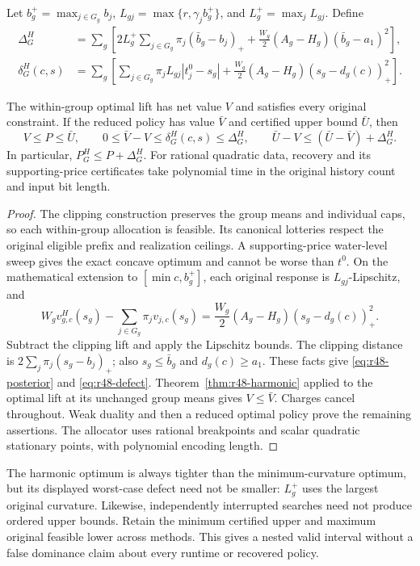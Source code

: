 Let $b_g^+=\max_{j\in G_g}b_j$, $L_{gj}=\max\{r,\gamma_jb_g^+\}$, and $L_g^+=\max_jL_{gj}$. Define
\begin{align}
 \Delta_G^H&=\sum_g\left[2L_g^+\sum_{j\in G_g}\pi_j(\bar b_g-b_j)_+
       +\frac{W_g}{2}(A_g-H_g)(\bar b_g-a_1)^2\right],\label{eq:r48-defect}\\
 \delta_G^H(c,s)&=\sum_g\left[\sum_{j\in G_g}\pi_jL_{gj}|t_j^0-s_g|
       +\frac{W_g}{2}(A_g-H_g)(s_g-d_g(c))_+^2\right].\label{eq:r48-posterior}
\end{align}
\begin{theorem}\label{thm:r48-lift}
The within-group optimal lift has net value $V$ and satisfies every original constraint. If the reduced policy has value $\bar V$ and certified upper bound $\bar U$, then
\begin{equation}\label{eq:r48-interval}
 V\leq P\leq\bar U,\qquad
 0\leq\bar V-V\leq\delta_G^H(c,s)\leq\Delta_G^H,
 \qquad \bar U-V\leq(\bar U-\bar V)+\Delta_G^H.
\end{equation}
In particular, $P_G^H\leq P+\Delta_G^H$. For rational quadratic data, recovery and its supporting-price certificates take polynomial time in the original history count and input bit length.
\end{theorem}
\begin{proof}
The clipping construction preserves the group means and individual caps, so each within-group allocation is feasible. Its canonical lotteries respect the original eligible prefix and realization ceilings. A supporting-price water-level sweep gives the exact concave optimum and cannot be worse than $t^0$. On the mathematical extension to $[\min c,b_g^+]$, each original response is $L_{gj}$-Lipschitz, and
\[
 W_gv^H_{g,c}(s_g)-\sum_{j\in G_g}\pi_jv_{j,c}(s_g)
       =\frac{W_g}{2}(A_g-H_g)(s_g-d_g(c))_+^2.
\]
Subtract the clipping lift and apply the Lipschitz bounds. The clipping distance is $2\sum_j\pi_j(s_g-b_j)_+$; also $s_g\leq\bar b_g$ and $d_g(c)\geq a_1$. These facts give \eqref{eq:r48-posterior} and \eqref{eq:r48-defect}. Theorem~\ref{thm:r48-harmonic} applied to the optimal lift at its unchanged group means gives $V\leq\bar V$. Charges cancel throughout. Weak duality and then a reduced optimal policy prove the remaining assertions. The allocator uses rational breakpoints and scalar quadratic stationary points, with polynomial encoding length.
\end{proof}

The harmonic optimum is always tighter than the minimum-curvature optimum, but its displayed worst-case defect need not be smaller: $L_g^+$ uses the largest original curvature. Likewise, independently interrupted searches need not produce ordered upper bounds. Retain the minimum certified upper and maximum original feasible lower across methods. This gives a nested valid interval without a false dominance claim about every runtime or recovered policy.

